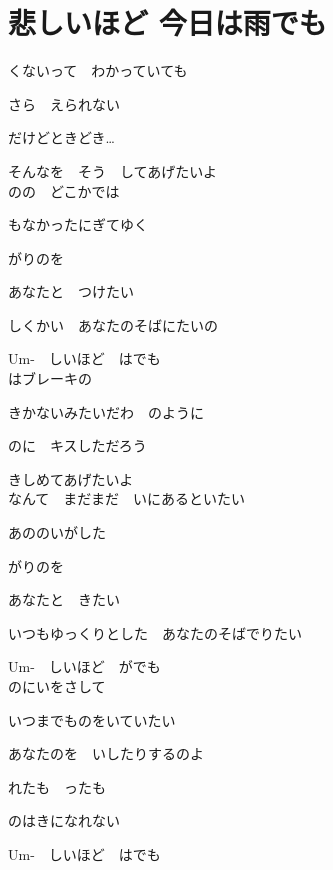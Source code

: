 \section{ 悲しいほど 今日は雨でも}
\large{

くないって　わかっていても

さら　えられない

だけどときどき…

そんなを　そう　してあげたいよ
\\

のの　どこかでは

もなかったにぎてゆく

がりのを

あなたと　つけたい

しくかい　あなたのそばにたいの

Um-　しいほど　はでも
\\

はブレーキの

きかないみたいだわ　のように

のに　キスしただろう

きしめてあげたいよ
\\

なんて　まだまだ　いにあるといたい

あののいがした

がりのを

あなたと　きたい

いつもゆっくりとした　あなたのそばでりたい

Um-　しいほど　がでも
\\

のにいをさして

いつまでものをいていたい

あなたのを　いしたりするのよ

れたも　ったも

のはきになれない

Um-　しいほど　はでも

}
{ \ }

